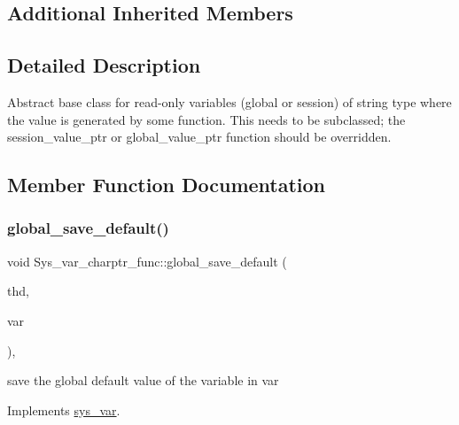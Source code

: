 \subsection*{Additional Inherited Members}


\subsection{Detailed Description}
Abstract base class for read-\/only variables (global or session) of string type where the value is generated by some function. This needs to be subclassed; the session\+\_\+value\+\_\+ptr or global\+\_\+value\+\_\+ptr function should be overridden. 

\subsection{Member Function Documentation}
\mbox{\label{classSys__var__charptr__func_abdfe65908bebe29b4345427a6da67213}} 
\subsubsection{\texorpdfstring{global\+\_\+save\+\_\+default()}{global\_save\_default()}}
{\footnotesize\ttfamily void Sys\+\_\+var\+\_\+charptr\+\_\+func\+::global\+\_\+save\+\_\+default (\begin{DoxyParamCaption}\item[{T\+HD $\ast$}]{thd,  }\item[{\mbox{\hyperlink{classset__var}{set\+\_\+var}} $\ast$}]{var }\end{DoxyParamCaption})\hspace{0.3cm}{\ttfamily [inline]}, {\ttfamily [virtual]}}

save the global default value of the variable in var 

Implements \mbox{\hyperlink{classsys__var}{sys\+\_\+var}}.

\mbox{\label{classSys__var__charptr__func_a38ee2df3e1f0168c9ff033738f3b32dc}} 
